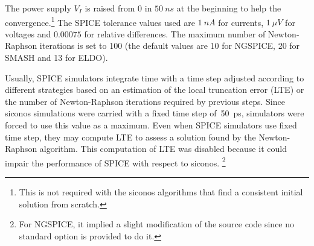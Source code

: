\documentclass{article}
\begin{document}
The power supply $V_I$ is raised from 0 in $50~ns$ at the beginning to help the convergence.\footnote{This is
not required with the {\sc siconos} algorithms that find a consistent initial solution from scratch.}
The SPICE tolerance values used are $1~nA$ for currents, $1~\mu V$ for voltages and $0.00075$ for relative differences.
The maximum number of Newton-Raphson iterations is set to 100 (the default values are 10 for NGSPICE, 20 for SMASH and
13 for ELDO).

Usually, SPICE simulators integrate time with a time step adjusted according to different strategies based on an estimation
of the local truncation error (LTE) or the number of Newton-Raphson iterations required by previous steps.
Since {\sc siconos} simulations were carried with a fixed time step of~50~ps, simulators were forced to use this value as a maximum.
Even when SPICE simulators use fixed time step, they may compute LTE to assess a solution found by the Newton-Raphson
algorithm. This computation of LTE was disabled because it could impair the performance of SPICE with respect to {\sc siconos}.
\footnote{For NGSPICE, it implied a slight modification of the source code since no standard option is provided to do it.}
\end{document}
